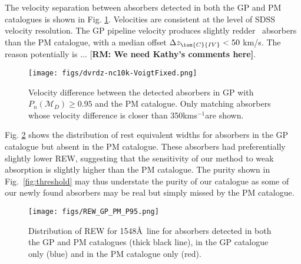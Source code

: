 \documentclass[fleqn,usenatbib]{mnras}
\newcommand{\civ}{\ion{C}{IV}}
\newcommand{\zciv}{z_{\civ}}
\newcommand{\sciv}{\sigma_{\civ}}
\newcommand{\kms}{kms$^{-1}$} %
\newcommand{\model}{\mathcal{M}}
\newcommand{\rmon}[1]{\textcolor{rez}{[\bf RM: #1]}}
\begin{document}

The velocity separation between absorbers detected in both the GP and PM catalogues is shown in
Fig. \ref{fig:dz}. Velocities are consistent at the level of SDSS velocity
resolution. The GP pipeline velocity produces slightly redder \civ~absorbers than the PM catalogue, with a median offset $\Delta \zciv < 50$ km/s. The reason potentially is ... \rmon{We need Kathy's comments here}.
\begin{figure}
  \texttt{[image: figs/dvrdz-nc10k-VoigtFixed.png]}
  \caption{Velocity difference between  the detected absorbers in
  GP with $P_n(\model_D)\ge0.95$ and the PM catalogue. Only matching absorbers whose velocity difference is closer than 350\kms are shown. }
  \label{fig:dz}
\end{figure}

Fig. \ref{fig:REWDR12} shows the distribution of rest equivalent widths for absorbers in the GP catalogue but absent in the PM catalogue.
These absorbers had preferentially slightly lower REW, suggesting that the sensitivity of our method to weak absorption is slightly higher than the PM catalogue. The purity shown in Fig.~\ref{fig:threshold} may thus understate the purity of our catalogue as some of our newly found absorbers may be real but simply missed by the PM catalogue.

\begin{figure}
  \texttt{[image: figs/REW\_GP\_PM\_P95.png]}
  \caption{Distribution of REW for 1548\AA~line for absorbers detected in both the GP and PM catalogues (thick black line), in the GP catalogue only (blue) and in the PM catalogue only (red).
  }
  \label{fig:REWDR12}
\end{figure}
\end{document}
